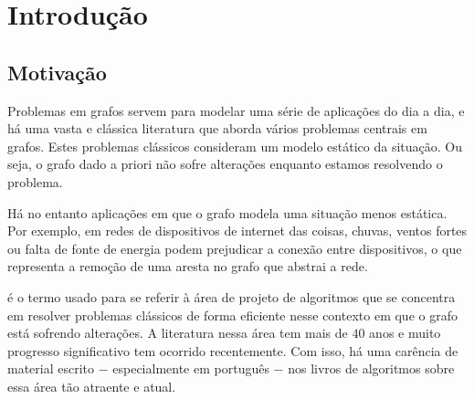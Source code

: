 \chapter{Introdução}

\section{Motivação}
\label{sec:Motivação}
Problemas em grafos servem para modelar uma série de aplicações do dia a dia,
e há uma vasta e clássica literatura que aborda vários problemas centrais em grafos. Estes problemas clássicos consideram um modelo estático da situação. Ou seja, o grafo dado a priori não sofre alterações enquanto estamos resolvendo o problema.

Há no entanto aplicações em que o grafo modela uma situação menos estática. Por exemplo, em redes de dispositivos de internet das coisas, chuvas, ventos fortes ou falta de fonte de energia podem prejudicar a conexão entre dispositivos, o que representa a remoção de uma aresta no grafo que abstrai a rede.

 é o termo usado para se referir à área de projeto de algoritmos que se concentra em resolver problemas clássicos de forma eficiente nesse contexto em que o grafo está sofrendo alterações. A literatura nessa área tem mais de $40$ anos e muito progresso significativo tem ocorrido recentemente.  Com isso, há uma carência de material escrito $-$ especialmente em português $-$ nos livros de algoritmos sobre essa área tão atraente e atual.

